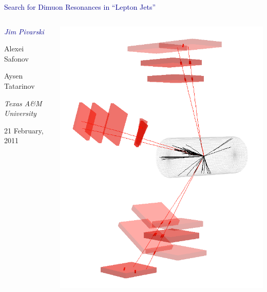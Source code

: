\documentclass[compress]{beamer}
\begin{document}
\begin{frame}
\vfill
\begin{center}
\textcolor{darkblue}{\Large Search for Dimuon Resonances in ``Lepton Jets''}

\vfill
\begin{columns}
\begin{center}
\large
\textcolor{darkblue}{\it Jim Pivarski}

Alexei Safonov

Aysen Tatarinov

\vspace{0.5 cm}
\scriptsize
{\it Texas A\&M University}

\vspace{0.5 cm}
\normalsize
21 February, 2011
\end{center}

\includegraphics[width=\linewidth]{eventdisplay_3d.png}
\end{columns}

\end{center}
\end{frame}
\end{document}
